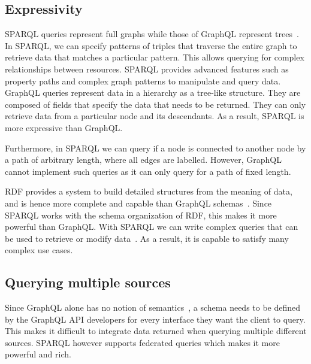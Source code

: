 

\subsection{Expressivity}
SPARQL queries represent full graphs while those of GraphQL represent trees~\cite{Taelman2018}. In SPARQL, we can specify patterns of triples that traverse the entire graph to retrieve data that matches a particular pattern. This allows querying for complex relationships between resources. SPARQL provides advanced features such as property paths and complex graph patterns to manipulate and query data. GraphQL queries represent data in a hierarchy as a tree-like structure. They are composed of fields that specify the data that needs to be returned. They can only retrieve data from a particular node and its descendants. As a result, SPARQL is more expressive than GraphQL.


Furthermore, in SPARQL we can query if a node is connected to another node by a path of arbitrary length, where all edges are labelled. However, GraphQL cannot implement such queries as it can only query for a path of fixed length.

RDF provides a system to build detailed structures from the meaning of data, and is hence more complete and capable than GraphQL schemas~\cite{Dresslar2019}. Since SPARQL works with the schema organization of RDF, this makes it more powerful than GraphQL. With SPARQL we can write complex queries that can be used to retrieve or modify data~\cite{Angele2022}. As a result, it is capable to satisfy many complex use cases.

\subsection{Querying multiple sources}
Since GraphQL alone has no notion of semantics~\cite{Taelman2018}, a schema needs to be defined by the GraphQL API developers for every interface they want the client to query. This makes it difficult to integrate data returned when querying multiple different sources. SPARQL however supports federated queries which makes it more powerful and rich. 